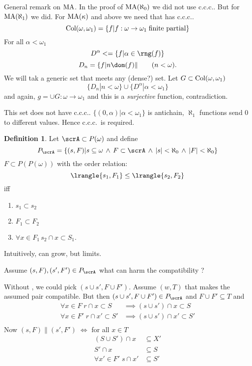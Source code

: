 \documentclass[11pt,pdftex,twoside,a4paper]{article}
\newcommand{\MA}{\ensuremath{\mathop{\rm MA}\nolimits}}
\newcommand{\ccc}{c.c.c.}
\newcommand{\finitepartial}{\textnormal{finite partial}}
\theoremstyle{definition}
\newtheorem{ldef}[thm]{Definition}
\begin{document}
General remark on \MA.
In the proof of \(\MA(\aleph_0)\) we did not use \ccc.
But for \(\MA(\aleph_1)\) we did.
For \(\MA(\kappa)\) and above we need that  has \ccc.
\begin{equation*}
\textnormal{Col}(\omega,\omega_1) 
  = \{f| f: \omega\to\omega_1 \;\finitepartial\}
\end{equation*}
For all \(\alpha< \omega_1\)
\begin{equation*}
D^\alpha< = \{f| \alpha\in\rng(f)\}
\end{equation*}
\begin{equation*}
D_n = \{f| n \dom(f)\| \qquad (n < \omega).
\end{equation*}
We will tak a generic set that meets any (dense?) set.
Let \(G\subset \textnormal{Col}(\omega,\omega_1)\)
\begin{equation*}
\{D_n| n < \omega\} \cup \{D^\alpha| \alpha < \omega_1\}
\end{equation*}
and again, \(g = \cup G: \omega\to\omega_1\)
and this is a \emph{surjective} function, contradiction.

This set does not have \ccc.
\(\{(0,\alpha)| \alpha < \omega_1\}\) is antichain, 
\(\aleph_1\) functions send $0$ to different values. Hence \ccc\ is required.

\begin{ldef}
Let \(\scrA \subset P(\omega)\) and define
\begin{equation*}
P_\scrA = \{(s,F)|  s\subseteq\omega \,\land\, F\subset\scrA 
  \,\land\, |s|<\aleph_0 \,\land\, |F|<\aleph_0\}
\end{equation*}
\(F\subset P(P(\omega))\) with the order relation:
\begin{equation*}
  \lrangle{s_1,F_1} \leq \lrangle{s_2,F_2}
\end{equation*}
iff
\begin{enumerate}
\item \(s_1 \subset s_2\)
\item \(F_1 \subset F_2\)
\item \(\forall x\in F_1\, s_2\cap x \subset S_1\).
\end{enumerate}
\end{ldef}
Intuitively, can grow, but  limits.

Assume \((s,F), (s',F') \in P_\scrA\) what can harm the compatibility ?

Without , we could pick \((s\cup s',F\cup F')\).
Assume \((w,T)\) that makes the assumed pair compatible. But then 
\((s\cup s',F\cup F')\in P_\scrA\) and \(F\cup F' \subseteq T\)
and
\begin{align*}
\forall x\in F\;
r \cap x \subset S   &\implies (s\cup s')\cap x\subset S \\
\forall x\in F'\;
r \cap x' \subset S' &\implies (s\cup s')\cap x'\subset S' \\
\end{align*}
Now \((s,F) \| (s', F') \; \Leftrightarrow\)
for all \(x\in T\) %
\begin{align*}
(S\cup S')\cap x &\subseteq X'\\
S'\cap x &\subseteq S\\
\forall x'\in F'\; s \cap x' &\subseteq S'
\end{align*}
\end{document}
